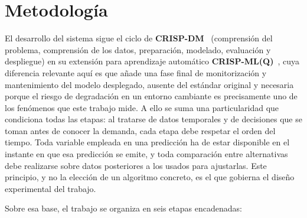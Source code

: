 \section{Metodología}
El desarrollo del sistema sigue el ciclo de \textbf{CRISP-DM}~\cite{chapman2000crispdm}
(comprensión del problema, comprensión de los datos, preparación, modelado, evaluación y
despliegue) en su extensión para aprendizaje automático \textbf{CRISP-ML(Q)}~\cite{studer2021crispmlq},
cuya diferencia relevante aquí es que añade una fase final de monitorización y mantenimiento del
modelo desplegado, ausente del estándar original y necesaria porque el riesgo de degradación en un
entorno cambiante es precisamente uno de los fenómenos que este trabajo mide. A ello se suma una
particularidad que condiciona todas las etapas: al tratarse de datos temporales y de decisiones que se toman antes
de conocer la demanda, cada etapa debe respetar el orden del tiempo. Toda variable empleada en una
predicción ha de estar disponible en el instante en que esa predicción se emite, y toda comparación
entre alternativas debe realizarse sobre datos posteriores a los usados para ajustarlas. Este
principio, y no la elección de un algoritmo concreto, es el que gobierna el diseño experimental del
trabajo.

Sobre esa base, el trabajo se organiza en seis etapas encadenadas:

